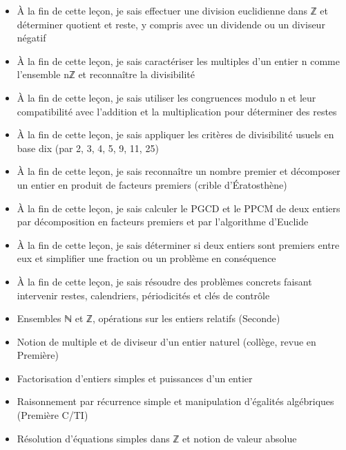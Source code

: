 \documentclass[11pt]{article}
\begin{document}
\begin{objectifs}
\begin{itemize}
\item À la fin de cette leçon, je sais effectuer une division euclidienne dans ℤ et déterminer quotient et reste, y compris avec un dividende ou un diviseur négatif
\item À la fin de cette leçon, je sais caractériser les multiples d'un entier n comme l'ensemble nℤ et reconnaître la divisibilité
\item À la fin de cette leçon, je sais utiliser les congruences modulo n et leur compatibilité avec l'addition et la multiplication pour déterminer des restes
\item À la fin de cette leçon, je sais appliquer les critères de divisibilité usuels en base dix (par 2, 3, 4, 5, 9, 11, 25)
\item À la fin de cette leçon, je sais reconnaître un nombre premier et décomposer un entier en produit de facteurs premiers (crible d'Ératosthène)
\item À la fin de cette leçon, je sais calculer le PGCD et le PPCM de deux entiers par décomposition en facteurs premiers et par l'algorithme d'Euclide
\item À la fin de cette leçon, je sais déterminer si deux entiers sont premiers entre eux et simplifier une fraction ou un problème en conséquence
\item À la fin de cette leçon, je sais résoudre des problèmes concrets faisant intervenir restes, calendriers, périodicités et clés de contrôle
\end{itemize}
\end{objectifs}

\begin{prerequis}
\begin{itemize}
\item Ensembles ℕ et ℤ, opérations sur les entiers relatifs (Seconde)
\item Notion de multiple et de diviseur d'un entier naturel (collège, revue en Première)
\item Factorisation d'entiers simples et puissances d'un entier
\item Raisonnement par récurrence simple et manipulation d'égalités algébriques (Première C/TI)
\item Résolution d'équations simples dans ℤ et notion de valeur absolue
\end{itemize}
\end{prerequis}
\end{document}
